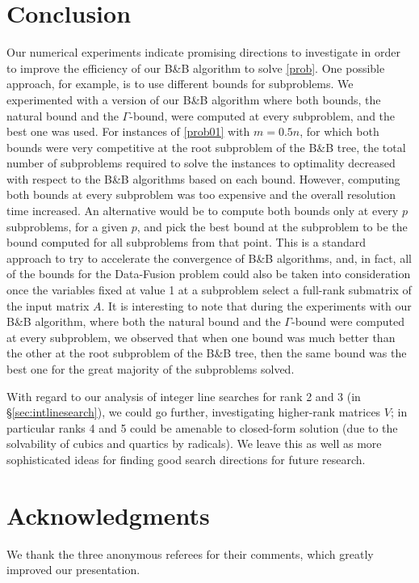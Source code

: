 \documentclass[smallextended]{svjour3hack}       %
\begin{document}
\section{Conclusion}
Our numerical experiments indicate promising directions to investigate in order to improve the efficiency of our B\&B algorithm to solve  \ref{prob}. One possible approach,  for example, is to use  different bounds for subproblems. We experimented with a version of our B\&B algorithm where both bounds, the natural bound and the $\Gamma$-bound, were computed at every subproblem, and the best one was used. For instances of \ref{prob01} with $m=0.5n$, for which both bounds were very competitive at the root subproblem of the B\&B tree, the total number of subproblems required to solve the instances to optimality  decreased with respect to the B\&B algorithms based on each bound. However, computing both bounds at every subproblem was too expensive and the overall resolution time increased. An alternative would be to compute both bounds only at every $p$ subproblems, for a given $p$, and pick the best bound at the subproblem to be the bound computed for all subproblems from that point. This is a standard approach to try to accelerate the convergence of  B\&B algorithms, and, in fact, all of the bounds for the Data-Fusion problem could also be taken into consideration once the variables fixed at value 1 at a subproblem select a full-rank submatrix of the input matrix $A$. It is interesting to note that during the experiments with our B\&B algorithm, where both the natural bound and the $\Gamma$-bound were computed at every subproblem, we observed that when one bound  was much better than the other at the root subproblem of the B\&B tree, then the same bound was the best one for the great majority of the subproblems solved. 

With regard to our analysis 
of integer line searches for rank 2 and 3 (in \S\ref{sec:intlinesearch}),
we could go further, investigating higher-rank matrices $V$; in particular 
ranks 4 and 5 could be amenable to closed-form solution
(due to the solvability of cubics and quartics by radicals). 
We leave this as well as more sophisticated ideas for 
finding good search directions for future research.

\section*{Acknowledgments}

We thank the three anonymous referees for their comments, which greatly improved our presentation.
\end{document}

